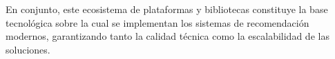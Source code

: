 En conjunto, este ecosistema de plataformas y bibliotecas constituye la base tecnológica sobre la cual se implementan los sistemas de recomendación modernos, garantizando tanto la calidad técnica como la escalabilidad de las soluciones.













